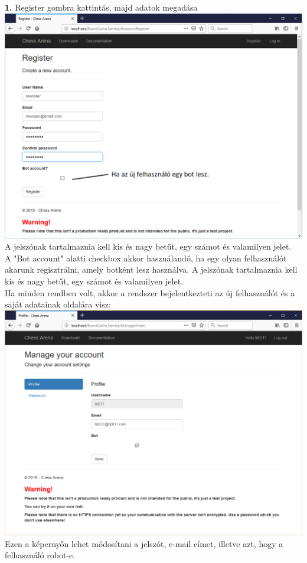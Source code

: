 \documentclass[twoside, a4paper, 12pt]{book}
\begin{document}
\noindent \textbf{1.} Register gombra kattintás, majd adatok megadása \\
\includegraphics[width=1.0\textwidth]{img/service_register.png} \\
A jelszónak tartalmaznia kell kis és nagy betűt, egy számot és valamilyen jelet.\\
A "Bot account" alatti checkbox akkor használandó, ha egy olyan felhasználót akarunk regisztrálni, amely botként lesz használva. A jelszónak tartalmaznia kell kis és nagy betűt, egy számot és valamilyen jelet. \\
Ha minden rendben volt, akkor a rendszer bejelentkezteti az új felhasználót és a saját adatainak oldalára visz: \\
\includegraphics[width=1.0\textwidth]{img/service_account.png} \\
Ezen a képernyőn lehet módosítani a jelszót, e-mail címet, illetve azt, hogy a felhasználó robot-e.
\end{document}
